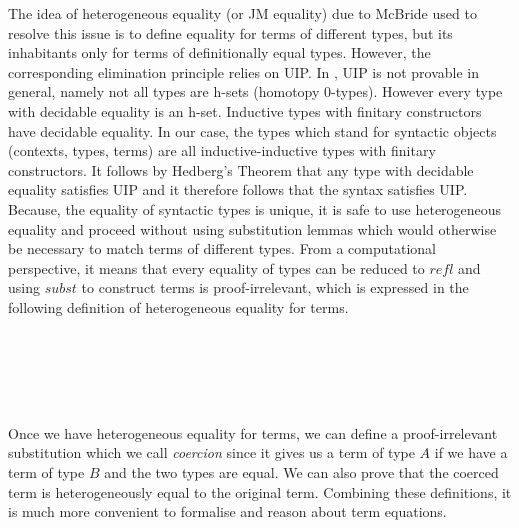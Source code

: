 The idea of heterogeneous equality (or JM equality) due to McBride
\cite{mcbride:elimination} used to resolve this issue is to define
equality for terms of different types, but its inhabitants only for
terms of definitionally equal types. However, the corresponding
elimination principle relies on UIP.  In \itt, UIP is not provable
in general, namely not all types are h-sets (homotopy
0-types). However every type with decidable equality is an h-set.
Inductive types with finitary constructors have decidable equality. In
our case, the types which stand for syntactic objects (contexts,
types, terms) are all inductive-inductive types with finitary
constructors. It follows by Hedberg's Theorem \cite{hed:98} that any
type with decidable equality satisfies UIP and it therefore follows
that the syntax satisfies UIP. Because, the equality of syntactic
types is unique, it is safe to use heterogeneous equality and proceed
without using substitution lemmas which would otherwise be necessary
to match terms of different types. From a computational perspective,
it means that every equality of types can be reduced to
$\mathit{refl}$ and using $\mathit{subst}$ to construct terms is
proof-irrelevant, which is expressed in the following definition of
heterogeneous equality for terms.


\begin{code}\>\<%
\\
\>  \AgdaSymbol{\{} \AgdaSymbol{:} \AgdaSymbol{\}\{} \AgdaSymbol{:}  \AgdaSymbol{\}} \AgdaSymbol{:}\<%
\\
\>[2]\<[9]%
\>[9]\AgdaSymbol{\{} \AgdaSymbol{:}  \AgdaSymbol{\}}         \<%
\\
\>[0]\<[2]%
\>[2] \AgdaSymbol{:} \AgdaSymbol{(} \AgdaSymbol{:}  \AgdaSymbol{)}    \<%
\\
\>\<\end{code}
Once we have heterogeneous equality for terms, we can define a proof-irrelevant substitution which we call \emph{coercion} since it gives us a term of type $A$ if we have a term of type $B$ and the
two types are equal. We can also prove that the coerced term is heterogeneously equal to the
original term. Combining these definitions, it is much
more convenient to formalise and reason about term equations.

